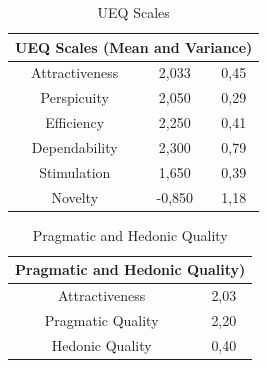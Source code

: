 \documentclass[conference,onecolumn]{IEEEtran}
\begin{document}
    \begin{table}[H]	
        \begin{center}
            \begin{tabular}[H]{ |c|c|c|}
                \hline
                \multicolumn{3}{|c|}{\textbf{UEQ Scales (Mean and Variance)}}\\
                \hline
                Attractiveness	&2,033	&0,45 \\ \hline
                Perspicuity	    &2,050	&0,29 \\ \hline
                Efficiency	    &2,250	&0,41 \\ \hline
                Dependability	&2,300	&0,79 \\ \hline
                Stimulation	    &1,650	&0,39 \\ \hline
                Novelty	        &-0,850	&1,18 \\
                \hline
            \end{tabular}
        \end{center}
        \caption{UEQ Scales}
        \label{table: UEQ Scales}
    \end{table}

    \begin{table}[H]	
        \begin{center}
            \begin{tabular}[H]{ |c|c|}
                \hline
                \multicolumn{2}{|c|}{\textbf{Pragmatic and Hedonic Quality)}} \\
                \hline
                Attractiveness	    &2,03 \\ \hline
                Pragmatic Quality	&2,20 \\ \hline
                Hedonic Quality	    &0,40 \\
                \hline
            \end{tabular}
        \end{center}
        \caption{Pragmatic and Hedonic Quality}
        \label{table: Pragmatic and Hedonic Quality}
    \end{table}
\end{document}
